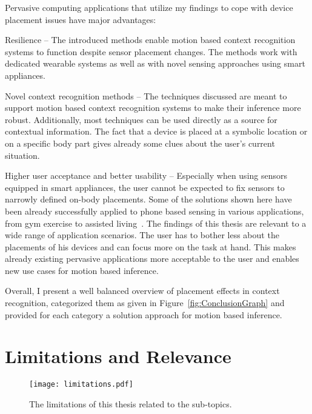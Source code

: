 Pervasive computing applications that utilize my findings to cope with device placement issues have major advantages: 
\begin{description}
\item{Resilience} -- The introduced methods enable motion based context recognition systems to function despite
sensor placement changes. The methods work with dedicated wearable systems as well as with novel sensing approaches using smart appliances.
\item{Novel context recognition methods} -- The techniques discussed are meant to support motion based context recognition systems to make their inference more robust. Additionally, most techniques can be used directly as a source for contextual information. The fact that a device is placed at a symbolic location or on a specific body part gives already some clues about the user's current situation.
\item{Higher user acceptance and better usability} -- Especially when using sensors equipped in smart appliances, the user cannot be expected to fix sensors to narrowly defined on-body placements. Some of the solutions shown here have been already successfully applied to phone based sensing in various applications, from gym exercise to assisted living~\cite{Muehlbauer:2011ir,Bahle:2010ww,Franke:2009ei}. The findings of this thesis are relevant to a wide range of application scenarios. The user has to bother less about the placements of his devices and can focus more on the task at hand. This makes already existing pervasive applications more acceptable to the user and enables new use cases for motion based inference.
\end{description}

Overall, I present a well balanced overview of placement effects in context recognition,
categorized them as given in Figure~\ref{fig:ConclusionGraph} and provided for each category 
a solution approach for motion based inference. 

\section{Limitations and Relevance}

\begin{figure}[t]
  \begin{center}
  \texttt{[image: limitations.pdf]}
	\end{center}
  \caption[Thesis limitations]{The limitations of this thesis related to the sub-topics.}
\label{fig:LimitationGraph}
\end{figure}

